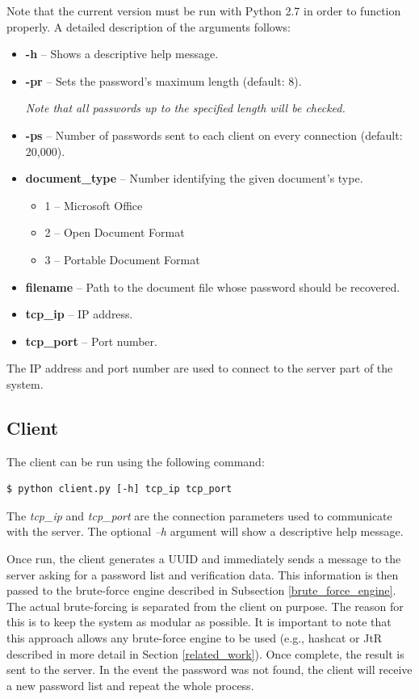 \documentclass[11pt,oneside]{fithesis2}
\begin{document}
Note that the current version must be run with Python 2.7 in order to function properly. A detailed description of the arguments follows:

\begin{itemize}
\setlength\itemsep{0.1em}
	\item{\textbf{-h} -- Shows a descriptive help message.}
	\item{\textbf{-pr} -- Sets the password's maximum length (default: 8).}

	\textit{Note that all passwords up to the specified length will be checked.}
	\item{\textbf{-ps} -- Number of passwords sent to each client on every connection (default: 20,000).}
	\item{\textbf{document\_type} -- Number identifying the given document's type.}
		\begin{itemize}
		\setlength\itemsep{0.1em}
			\item{1 -- Microsoft Office}
			\item{2 -- Open Document Format}
			\item{3 -- Portable Document Format}
		\end{itemize}
	\item{\textbf{filename} -- Path to the document file whose password should be recovered.}
	\item{\textbf{tcp\_ip} --  IP address.} 
	\item{\textbf{tcp\_port} -- Port number.}
\end{itemize}\label{server_params}

The IP address and port number are used to connect to the server part of the system.

\subsection{Client}

The client can be run using the following command:
\begin{lstlisting}
$ python client.py [-h] tcp_ip tcp_port 
\end{lstlisting}

The \textit{tcp\_ip} and \textit{tcp\_port} are the connection parameters used to communicate with the server. The optional \textit{–h} argument will show a descriptive help message. 

Once run, the client generates a UUID and immediately sends a message to the server asking for a password list and verification data. This information is then passed to the brute-force engine described in Subsection \ref{brute_force_engine}. The actual brute-forcing is separated from the client on purpose. The reason for this is to keep the system as modular as possible. It is important to note that this approach allows any brute-force engine to be used (e.g., hashcat or JtR \cite{hashcat, jtr} described in more detail in Section \ref{related_work}).\label{jtrhc_modular} Once complete, the result is sent to the server. In the event the password was not found, the client will receive a new password list and repeat the whole process.
\end{document}

